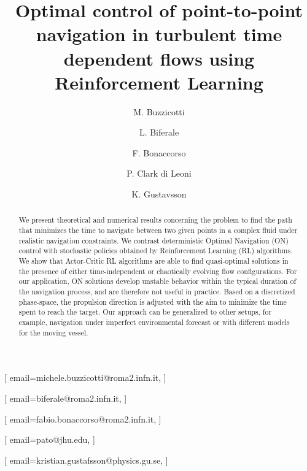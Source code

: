\documentclass[
]{ceurart}
\def\obs#1{{\color{black}{#1}}}
\def\MBB#1{{\color{black}{#1}}}
\begin{document}

\title{Optimal control of point-to-point navigation in
turbulent time dependent flows using Reinforcement Learning}

\author[1]{M. Buzzicotti}[%
email=michele.buzzicotti@roma2.infn.it,
]
\author[1]{L. Biferale}[%
email=biferale@roma2.infn.it,
]
\address[1]{Dept. Physiscs and INFN, University of Rome Tor Vergata, Via della Ricerca Scientifica 1, 00133 Rome -Italy}

\author[1,2]{F. Bonaccorso}[%
email=fabio.bonaccorso@roma2.infn.it,
]
\address[2]{Center for Life Nano Science@La Sapienza, Istituto Italiano di Tecnologia, 00161 Roma, Italy}

\author[3]{P. {Clark di Leoni}}[%
email=pato@jhu.edu,
]
\address[3]{Department of Mechanical Engineering, Johns Hopkins University, Baltimore, Maryland 21218, USA.}
\author[4]{K. Gustavsson}[%
email=kristian.gustafsson@physics.gu.se,
]
\address[4]{Dept. of Physics, University of Gothenburg, Gothenburg, 41296, Sweden.}

\begin{abstract}
We present theoretical and numerical results concerning the problem to find  the path that minimizes the time to navigate between two given points in a complex fluid under realistic navigation constraints. We contrast deterministic Optimal Navigation (ON) control with stochastic policies obtained by Reinforcement Learning (RL) algorithms. We show that Actor-Critic RL algorithms are able to find quasi-optimal solutions in the presence of either time-independent or chaotically evolving flow configurations. For our application, ON solutions develop unstable behavior within the typical duration of the navigation process, and are therefore not useful in practice. \obs{We first explore navigation of turbulent flow using a constant propulsion speed.} Based on a discretized phase-space, the propulsion direction is adjusted with the aim to minimize the time spent to reach the target. \MBB{Further, we explore a case where additional control is obtained by allowing the engine to power off. Exploiting advection of the underlying flow, allows the target to be reached with less energy consumption. In this case, we optimize a linear combination between the total navigation time and the total time the engine is switched off.} Our approach can be generalized to other setups, for example, navigation under imperfect environmental forecast or with different models for the moving vessel. 
\end{abstract}
\end{document}
